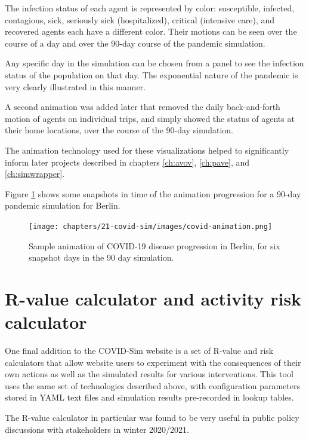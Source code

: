 The infection status of each agent is represented by color: susceptible, infected, contagious, sick, seriously sick (hospitalized), critical (intensive care), and recovered agents each have a different color. Their motions can be seen over the course of a day and over the 90-day course of the pandemic simulation.

Any specific day in the simulation can be chosen from a panel to see the infection status of the population on that day. The exponential nature of the pandemic is very clearly illustrated in this manner.

A second animation was added later that removed the daily back-and-forth motion of agents on individual trips, and simply showed the status of agents at their home locations, over the course of the 90-day simulation.

The animation technology used for these visualizations helped to significantly inform later projects described in chapters \ref{ch:avov}, \ref{ch:pave}, and \ref{ch:simwrapper}.

Figure \ref{fig:covid-animation} shows some snapshots in time of the animation progression for a 90-day pandemic simulation for Berlin.

\begin{figure}
  \centering
	\begin{minipage}{\textwidth}
    \centering
    \texttt{[image: chapters/21-covid-sim/images/covid-animation.png]}
  \caption{Sample animation of COVID-19 disease progression in Berlin, for six snapshot days in the 90 day simulation.}
  \label{fig:covid-animation}
	\end{minipage}
\end{figure}

\hypertarget{r-calculator}{%
\section{R-value calculator and activity risk calculator}\label{r-calculator}}

One final addition to the COVID-Sim website is a set of R-value and risk calculators that allow website users to experiment with the consequences of their own actions as well as the simulated results for various interventions. This tool uses the same set of technologies described above, with configuration parameters stored in YAML text files and simulation results pre-recorded in lookup tables.

The R-value calculator in particular was found to be very useful in public policy discussions with stakeholders in winter 2020/2021.

